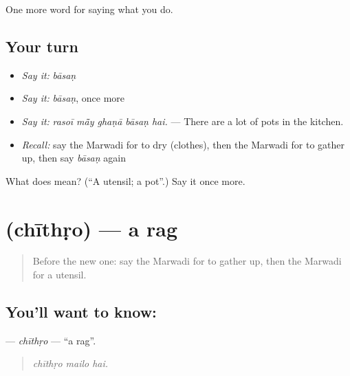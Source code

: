 \begin{grammarlens}[title={What you've built}]
One more word for saying what you do.
\end{grammarlens}

\subsection*{Your turn}
\begin{itemize}
\raggedright
  \item \emph{Say it:} \emph{bāsaṇ}
  \item \emph{Say it:} \emph{bāsaṇ}, once more
  \item \emph{Say it:} \emph{rasoī mā̃y ghaṇā bāsaṇ hai.} — There are a lot of pots in the kitchen.
  \item \emph{Recall:} say the Marwadi for to dry (clothes), then the Marwadi for to gather up, then say \emph{bāsaṇ} again
\end{itemize}

\begin{tcolorbox}[breakable,colback=teal!4,colframe=teal!35!black,title={Before you move on}]
What does  mean? (\textquotedblleft{}A utensil; a pot\textquotedblright{}.) Say it once more.
\end{tcolorbox}
\section[\texorpdfstring{\mw{चीथड़ो} (chīthṛo)}{चीथड़ो (chīthṛo)}]{ (chīthṛo) — a rag}

\label{lesson:MW-C171-chithro}



\begin{quote}
Before the new one: say the Marwadi for to gather up, then the Marwadi for a utensil.
\end{quote}

\subsection*{You'll want to know: }
\textbf{} — \emph{chīthṛo} — \textquotedblleft{}a rag\textquotedblright{}.

\begin{quote}
  
\end{quote}

\begin{quote}
\emph{chīthṛo mailo hai.}
\end{quote}

